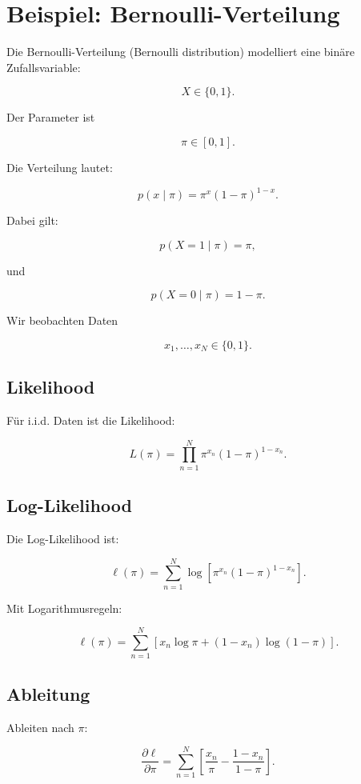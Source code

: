 \section{Beispiel: Bernoulli-Verteilung}

Die Bernoulli-Verteilung (Bernoulli distribution) modelliert eine binäre Zufallsvariable:

\[
    X \in \{0,1\}.
\]

Der Parameter ist

\[
    \pi \in [0,1].
\]

Die Verteilung lautet:

\[
    p(x \mid \pi)
    =
    \pi^x(1-\pi)^{1-x}.
\]

Dabei gilt:

\[
    p(X=1 \mid \pi) = \pi,
\]

und

\[
    p(X=0 \mid \pi) = 1-\pi.
\]

Wir beobachten Daten

\[
    x_1,\dots,x_N
    \in
    \{0,1\}.
\]

\subsection{Likelihood}

Für i.i.d. Daten ist die Likelihood:

\[
    L(\pi)
    =
    \prod_{n=1}^{N}
    \pi^{x_n}
    (1-\pi)^{1-x_n}.
\]

\subsection{Log-Likelihood}

Die Log-Likelihood ist:

\[
    \ell(\pi)
    =
    \sum_{n=1}^{N}
    \log
    \left[
        \pi^{x_n}
        (1-\pi)^{1-x_n}
    \right].
\]

Mit Logarithmusregeln:

\[
    \ell(\pi)
    =
    \sum_{n=1}^{N}
    \left[
        x_n \log \pi
        +
        (1-x_n)\log(1-\pi)
    \right].
\]

\subsection{Ableitung}

Ableiten nach \(\pi\):

\[
    \frac{\partial \ell}{\partial \pi}
    =
    \sum_{n=1}^{N}
    \left[
        \frac{x_n}{\pi}
        -
        \frac{1-x_n}{1-\pi}
    \right].
\]


